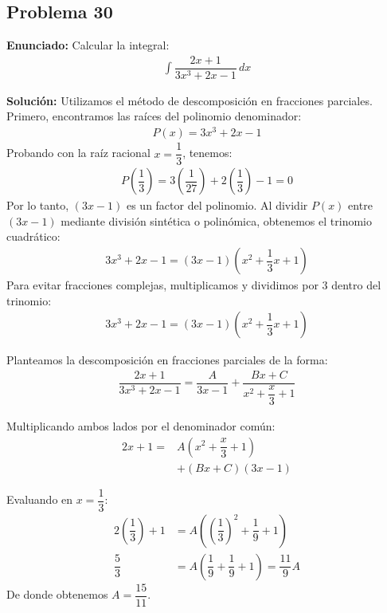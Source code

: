 \subsection*{Problema 30}
\textbf{Enunciado:} Calcular la integral:
\begin{align*}
\int \dfrac{2x + 1}{3x^3 + 2x - 1} \, dx
\end{align*}

\textbf{Solución:} 
Utilizamos el método de descomposición en fracciones parciales. 
Primero, encontramos las raíces del polinomio denominador:
\begin{align*}
P(x) = 3x^3 + 2x - 1
\end{align*}
Probando con la raíz racional $x = \dfrac{1}{3}$, tenemos:
\begin{align*}
P\left(\dfrac{1}{3}\right) = 3\left(\dfrac{1}{27}\right) + 2\left(\dfrac{1}{3}\right) - 1 = 0
\end{align*}
Por lo tanto, $(3x - 1)$ es un factor del polinomio. Al dividir $P(x)$ entre $(3x - 1)$ mediante división sintética o polinómica, obtenemos el trinomio cuadrático:
\begin{align*}
3x^3 + 2x - 1 = (3x - 1)(x^2 + \dfrac{1}{3}x + 1)
\end{align*}
Para evitar fracciones complejas, multiplicamos y dividimos por $3$ dentro del trinomio:
\begin{align*}
3x^3 + 2x - 1 = (3x - 1)(x^2 + \dfrac{1}{3}x + 1)
\end{align*}

Planteamos la descomposición en fracciones parciales de la forma:
\begin{align*}
\dfrac{2x + 1}{3x^3 + 2x - 1} = \dfrac{A}{3x - 1} + \dfrac{Bx + C}{x^2 + \dfrac{x}{3} + 1}
\end{align*}

Multiplicando ambos lados por el denominador común:
\begin{align*}
2x + 1 = &A\left(x^2 + \dfrac{x}{3} + 1\right) \\
&+ (Bx + C)(3x - 1)
\end{align*}

Evaluando en $x = \dfrac{1}{3}$:
\begin{align*}
2\left(\dfrac{1}{3}\right) + 1 &= A\left(\left(\dfrac{1}{3}\right)^2 + \dfrac{1}{9} + 1\right) \\
\dfrac{5}{3} &= A\left(\dfrac{1}{9} + \dfrac{1}{9} + 1\right) = \dfrac{11}{9}A
\end{align*}
De donde obtenemos $A = \dfrac{15}{11}$.

